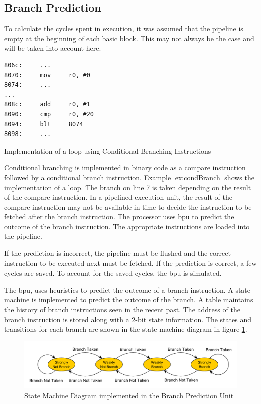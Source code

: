 \subsection{Branch Prediction}
\label{subsec:BranchPred}
To calculate the cycles spent in execution, it was assumed that the pipeline is empty at the beginning of each basic block. This may not always be the case and will be taken into account here.

\begin{Example}[h]
\begin{lstlisting}
806c:     ...
8070:     mov     r0, #0
8074:     ...
...
808c:     add     r0, #1
8090:     cmp     r0, #20
8094:     blt     8074
8098:     ...
\end{lstlisting}
\caption{Implementation of a loop using Conditional Branching Instructions}
\label{ex:condBranch}
\end{Example}

Conditional branching is implemented in binary code as a compare instruction followed by a conditional branch instruction. Example \ref{ex:condBranch} shows the implementation of a loop. The branch on line 7 is taken depending on the result of the compare instruction. In a pipelined execution unit, the result of the compare instruction may not be available in time to decide the instruction to be fetched after the branch instruction. The processor uses \gls{bpu} to predict the outcome of the branch instruction. The appropriate instructions are loaded into the pipeline.

If the prediction is incorrect, the pipeline must be flushed and the correct instruction to be executed next must be fetched. If the prediction is correct, a few cycles are saved. To account for the saved cycles, the \gls{bpu} is simulated.

The \gls{bpu}, uses heuristics to predict the outcome of a branch instruction. A state machine is implemented to predict the outcome of the branch. A table maintains the history of branch instructions seen in the recent past. The address of the branch instruction is stored along with a 2-bit state information. The states and transitions for each branch are shown in the state machine diagram in figure 
\ref{fig:bpuSMD}.

\begin{figure}[h]
\centering
\includegraphics[width=\textwidth]{figures/BranchPredictionSMD.pdf}
\caption{State Machine Diagram implemented in the Branch Prediction Unit}
\label{fig:bpuSMD}
\end{figure}

